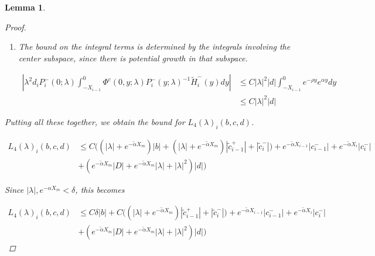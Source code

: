 \documentclass[12pt]{article}
\newtheorem{lemma}{Lemma}
\begin{document}
\begin{lemma}
\begin{proof}
\begin{enumerate}
Thus we have the expression for $e^{-\nu(\lambda)X_i} c_i^+$

\begin{align}\label{tildecminus2}
e^{-\nu(\lambda)X_i} c_i^+
&= e^{-\nu(\lambda)X_i} c_i^- + \mathcal{O}\Big( e^{-(\alpha - 2 \rho) X_i} ( |b_i^+| + |b_{i+1}^-| + |c_i^-| + |\lambda||d| + |D_i||d|) \Big)
\end{align}

which gives us the overall estimate

\begin{align*}
&|P_i^+(0; \lambda) - P^+(0))P_0^c(0) e^{-\nu(\lambda)X_i} c_i^+ + P_i^+(0; \lambda) (P_0^c(\lambda) - P_0^c(0)) e^{-\nu(\lambda)X_i} c_i^+| \\
&\leq C \Big( (e^{-\alpha X_m} + |\lambda|)|\tilde{c}_i^-| + e^{-(\alpha - 2 \rho) X_i} ( |b_i^+| + |b_{i+1}^-| + |c_i^-| + |\lambda||d| + |D_i||d|) \Big)
\end{align*}

\item The bound on the integral terms is determined by the integrals involving the center subspace, since there is potential growth in that subspace.

\begin{align*}
\left| \lambda^2 d_i P_i^-(0; \lambda) \int_{-X_{i-1}}^0 \Phi^c(0, y; \lambda) P_i^-(y; \lambda)^{-1} \tilde{H}_i^-(y) dy \right| &\leq C |\lambda|^2 |d| \int_{-X_{i-1}}^0 e^{-\rho y} e^{\alpha y} dy \\
&\leq C |\lambda|^2 |d|
\end{align*}

\end{enumerate}

Putting all these together, we obtain the bound for $L_4(\lambda)_i(b, c, d)$.

\begin{align}\label{L4bound}
L_4(\lambda)_i(b, c, d) &\leq 
C\Big( (|\lambda| + e^{-\tilde{\alpha}X_m})|b| 
+ (|\lambda| + e^{-\tilde{\alpha}X_m}) |\tilde{c}_{i-1}^+| + |\tilde{c}_i^-|) + e^{-\tilde{\alpha} X_{i-1}} |c_{i-1}^-| + e^{-\tilde{\alpha} X_i} |c_i^-| \nonumber \\
&+ ( e^{-\tilde{\alpha}X_m} |D| + e^{-\tilde{\alpha}X_m}|\lambda| + |\lambda|^2)|d| \Big) 
\end{align}

Since $|\lambda|, e^{-\alpha X_m} < \delta$, this becomes

\begin{align}\label{L4bound}
L_4(\lambda)_i(b, c, d) &\leq C \delta |b| + 
C\Big( (|\lambda| + e^{-\tilde{\alpha}X_m}) |\tilde{c}_{i-1}^+| + |\tilde{c}_i^-|) + e^{-\tilde{\alpha} X_{i-1}} |c_{i-1}^-| + e^{-\tilde{\alpha} X_i} |c_i^-| \nonumber \\
&+ ( e^{-\tilde{\alpha}X_m} |D| + e^{-\tilde{\alpha}X_m}|\lambda| + |\lambda|^2)|d| \Big) 
\end{align}


\end{proof}
\end{lemma}
\end{document}
